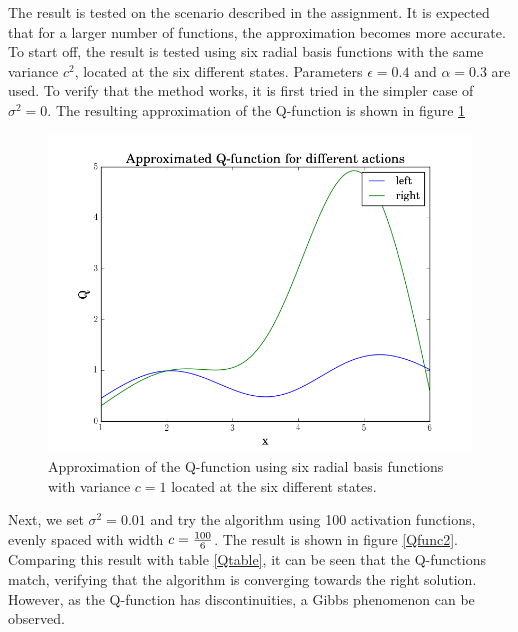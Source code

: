 \documentclass [a4paper] {report}
\begin{document}
	\noindent
	The result is tested on the scenario described in the assignment. It is expected that for a larger number of functions, the approximation becomes more accurate. To start off, the result is tested using six radial basis functions with the same variance $c^{2}$, located at the six different states. Parameters $\epsilon=0.4$ and $\alpha=0.3$ are used. To verify that the method works, it is first tried in the simpler case of $\sigma^{2}=0$. The resulting approximation of the Q-function is shown in figure \ref{Qfunc1}
	
	\begin{figure}[H]
		\begin{center}
			\includegraphics[scale=0.4]{Images/q_approx6.png}
			\caption{Approximation of the Q-function using six radial basis functions with variance $c=1$ located at the six different states.}
			\label{Qfunc1}
		\end{center}
	\end{figure}
	
	\noindent
	Next, we set $\sigma^{2}=0.01$ and try the algorithm using 100 activation functions, evenly spaced with width $c={100 \over 6}$.  The result is shown in figure \ref{Qfunc2}. Comparing this result with table \ref{Qtable}, it can be seen that the Q-functions match, verifying that the algorithm is converging towards the right solution. However, as the Q-function has discontinuities, a Gibbs phenomenon can be observed.
	
\end{document}
